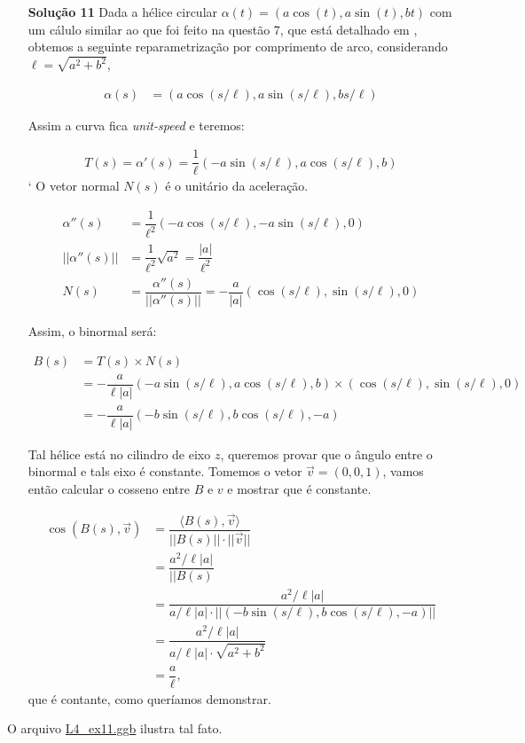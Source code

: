 \documentclass[12pt,letterpaper]{article}
\newcommand{\sol}[1]{\textbf{Solução #1}}
\begin{document}
\begin{enumerate}
	\item[\sol{11}] Dada a hélice circular $\alpha(t)=(a\cos(t),a\sin(t),bt)$ com um cálulo similar ao que foi feito na questão 7, que está detalhado em \cite{ronaldo}, obtemos a seguinte reparametrização por comprimento de arco, considerando $\ell=\sqrt{a^2+b^2}$,
	
	\begin{align*}
		\alpha(s)&=\left(a\cos\left(s/\ell\right),a\sin\left(s/\ell\right),bs/{\ell}\right)
	\end{align*}
	
	Assim a curva fica \textit{unit-speed} e teremos:
	
	\begin{align*}
		T(s)=\alpha'(s)=\dfrac1\ell(-a\sin(s/\ell),a\cos(s/\ell),b)
	\end{align*}
	`
	O vetor normal $N(s)$ é o unitário da aceleração. 
	
	\begin{align*}
		\alpha''(s)&=\dfrac{1}{\ell^2}(-a\cos(s/\ell),-a\sin(s/\ell),0)\\
		||\alpha''(s)||&=\dfrac{1}{\ell^2}\sqrt{a^2}=\dfrac{|a|}{\ell^2}\\
		N(s)&=\dfrac{\alpha''(s)}{||\alpha''(s)||}=-\dfrac{a}{|a|}(\cos(s/\ell),\sin(s/\ell),0)
	\end{align*}
	
	Assim, o binormal será:
	
	\begin{align*}
		B(s)&=T(s)\times N(s)\\
		&=-\dfrac{a}{\ell|a|}(-a\sin(s/\ell),a\cos(s/\ell),b)\times(\cos(s/\ell),\sin(s/\ell),0)\\
		&=-\dfrac{a}{\ell|a|}(-b\sin(s/\ell),b\cos(s/\ell),-a)
	\end{align*}

	Tal hélice está no cilindro de eixo $z$, queremos provar que o ângulo entre o binormal e tals eixo é constante. Tomemos o vetor $\vec v=(0,0,1)$, vamos então calcular o cosseno entre $B$ e $v$ e mostrar que é constante.
	
	\begin{align*}
		\cos(B(s),\vec v)&=\dfrac{\langle B(s),\vec v\rangle}{||B(s)||\cdot||\vec v||}\\
		&=\dfrac{a^2/\ell|a|}{||B(s)}\\
		&=\dfrac{a^2/\ell|a|}{a/\ell|a|\cdot ||(-b\sin(s/\ell),b\cos(s/\ell),-a)||}\\
		&=\dfrac{a^2/\ell|a|}{a/\ell|a|\cdot \sqrt{a^2+b^2}}\\
		&=\dfrac{a}{\ell},
	\end{align*}
	que é contante, como queríamos demonstrar.
	\end{enumerate}

	O arquivo \href{https://github.com/reneroliveira/Curves_and_Surfaces/blob/main/ggb_files/L4_ex11.ggb}{L4\_ex11.ggb} ilustra tal fato.
	\newpage



\end{document}
